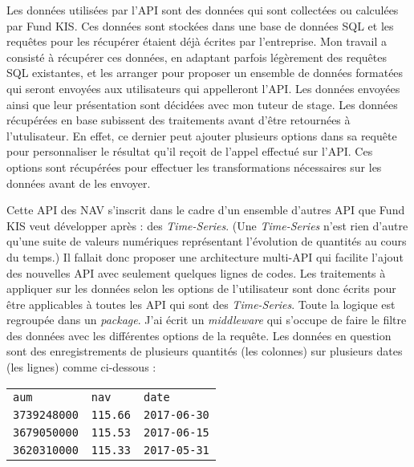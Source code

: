 \vspace{3mm}

Les données utilisées par l'API sont des données qui sont collectées ou calculées par Fund KIS. Ces données sont stockées dans une base de données SQL et les requêtes pour les récupérer étaient déjà écrites par l'entreprise. Mon travail a consisté à récupérer ces données, en adaptant parfois légèrement des requêtes SQL existantes, et les arranger pour proposer un ensemble de données formatées qui seront envoyées aux utilisateurs qui appelleront l'API. Les données envoyées ainsi que leur présentation sont décidées avec mon tuteur de stage. Les données récupérées en base subissent des traitements avant d'être retournées à l'utulisateur. En effet, ce dernier peut ajouter plusieurs options dans sa requête pour personnaliser le résultat qu'il reçoit de l'appel effectué sur l'API. Ces options sont récupérées pour effectuer les transformations nécessaires sur les données avant de les envoyer.

\vspace{3mm}

Cette API des NAV s'inscrit dans le cadre d'un ensemble d'autres API que Fund KIS veut développer après : des \textit{Time-Series}. (Une \textit{Time-Series} n'est rien d'autre qu'une suite de valeurs numériques représentant l'évolution de quantités au cours du temps.) Il fallait donc proposer une architecture multi-API qui facilite l'ajout des nouvelles API avec seulement quelques lignes de codes. Les traitements à appliquer sur les données selon les options de l'utilisateur sont donc écrits pour être applicables à toutes les API qui sont des \textit{Time-Series}. Toute la logique est regroupée dans un \textit{package}. J'ai écrit un \textit{middleware} qui s'occupe de faire le filtre des données avec les différentes options de la requête. Les données en question sont des enregistrements de plusieurs quantités (les colonnes) sur plusieurs dates (les lignes) comme ci-dessous :

\vspace{3mm}

\begin{tabular}{lll}
\centering
\texttt{aum} & \texttt{nav} & \texttt{date} \\
\texttt{3739248000} & \texttt{115.66} & \texttt{2017-06-30} \\
\texttt{3679050000} & \texttt{115.53} & \texttt{2017-06-15} \\
\texttt{3620310000} & \texttt{115.33} & \texttt{2017-05-31} \\
\end{tabular}

